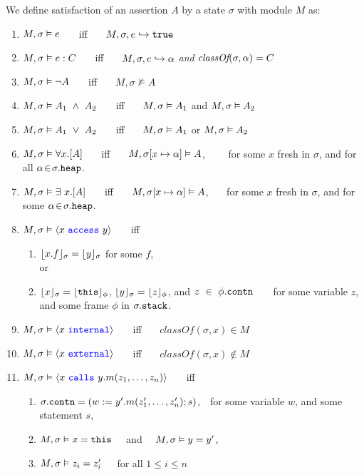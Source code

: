 \begin{definition} 
\label{def:chainmail-semantics}
We define satisfaction of an assertion $A$ by a %
state $\sigma$ with 
 module $M$ as:
\begin{enumerate}
\item
\label{cExpr}
$M , \sigma \vDash e$ \ \ \ iff \ \ \  $M, \sigma, e \hookrightarrow \texttt{true}$
\item
\label{cClass}
$M , \sigma \vDash e : C$ \ \ \ iff \ \ \  $M, \sigma, e \hookrightarrow \alpha$ \textit{and} $\textit{classOf}(\sigma, \alpha) = C$
\item
$M , \sigma \vDash \neg A$ \ \ \ iff \ \ \  ${M},{\sigma}\nvDash{A}$
\item
$\satisfiesA{M}{\sigma}{A_1\ \wedge\ A_2}$ \ \ \ iff \ \ \  $M , \sigma \vDash A_1$ and 
$M , \sigma \vDash A_2$
\item
$\satisfiesA{M}{\sigma}{A_1\ \vee\ A_2}$ \ \ \ iff \ \ \  $M , \sigma \vDash A_1$ or 
$M , \sigma \vDash A_2$
\item
\label{quant1}
$M , \sigma \vDash \forall x.[A]$ \ \ \ iff \ \ \  
$M , \sigma[x \mapsto \alpha] \vDash A$, \ 
\ \ \ for some $x$ fresh in $\sigma$, and for all $\alpha\!\in\!\sigma.{\texttt{heap}}$.
\item
\label{quant2}
$M , \sigma \vDash \exists\ x.[A]$ \ \ \ iff \ \ \  
$M , \sigma[x \mapsto \alpha] \vDash A$, \ 
\ \ for some $x$ fresh in $\sigma$, and for some $ \alpha\!\in\!\sigma.{\texttt{heap}}$. 
\item
\label{cAccess}
$M , \sigma \vDash \langle x\ {\color{blue}\texttt{access}}\ y \rangle$ \ \ \ iff \ \ \  
\begin{enumerate}
\item
\label{c1}
$\lfloor x.f \rfloor_{\sigma}={\lfloor y \rfloor_{\sigma}}$ for some $f$, \\
  or
\item
\label{c2}
{$\lfloor x \rfloor_{\sigma}=\lfloor {\texttt{this}} \rfloor_{\phi}$}, {$\lfloor y \rfloor_{\sigma}=\lfloor z \rfloor_{\phi}$}, and $z\ \in\ \phi.{\texttt{contn}}$\ \ \ \
for some variable $z$, and some frame $\phi$ in $\sigma.
{\texttt{stack}}$.
\end{enumerate}
\item
\label{cInternal}
$M , \sigma \vDash \langle x\ {\color{blue}\texttt{internal}}\rangle$ \ \ \ iff \ \ \  
$\textit{classOf}(\sigma,x) \in M$
\item
\label{cExternal}
$M , \sigma \vDash \langle x\ {\color{blue}\texttt{external}}\rangle$ \ \ \ iff \ \ \  
$\textit{classOf}(\sigma,x) \not\in M$
\item
\label{cCall}
$M , \sigma \vDash \langle x\ {\color{blue}\texttt{calls}}\ y.m(z_1, \ldots, z_n) \rangle$ \ \ \ iff \ \ \ 
\begin{enumerate}
\item
$\sigma.{\texttt{contn}} = (w := y'.m(z'_1,\ldots,z'_n){; s})$,\ \ for some 
variable $w$, and some statement $s$,
\item
$M , \sigma \vDash x = {\texttt{this}}$
\ \ and \ \ 
$M , \sigma \vDash y = y'$,
\item
$M , \sigma \vDash z_i = z'_i$\ \ \ for all $1\!\leq i\!\leq n$
\end{enumerate}
\end{enumerate}
\end{definition}

